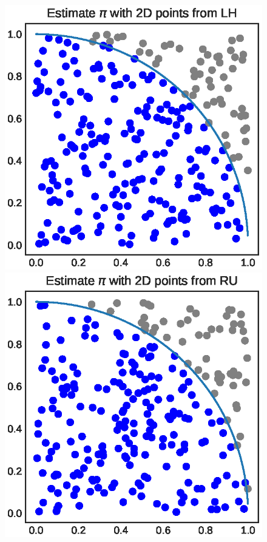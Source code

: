 \documentclass[shortabstract]{iithesis}
\begin{document}
\begin{figure}[!ht]
    \includegraphics[scale=.6]{LH_2D_circle.eps}
    \includegraphics[scale=.6]{RU_2D_circle.eps}
    

\end{figure}
\end{document}
